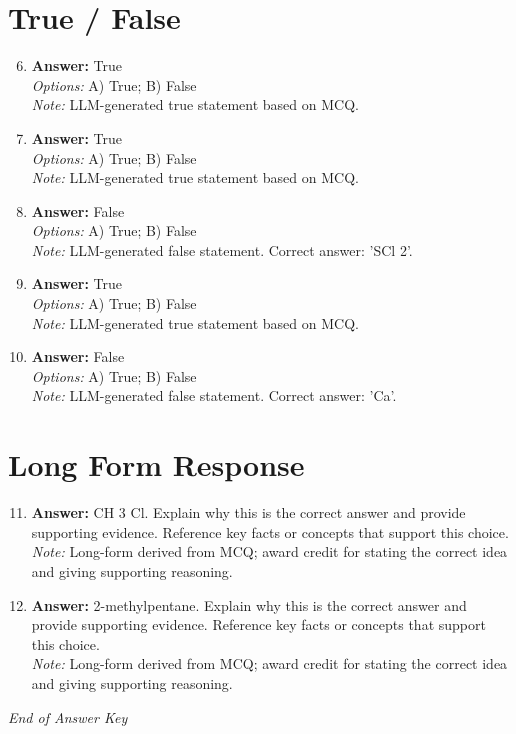 \documentclass[12pt]{article}
\begin{document}
\section*{True / False}
\begin{enumerate}[label=\arabic*.]
\setcounter{enumi}{5}
\item \textbf{Answer:} True
\\ \textit{Options:} A) True; B) False
\\ \textit{Note:} LLM-generated true statement based on MCQ.
\item \textbf{Answer:} True
\\ \textit{Options:} A) True; B) False
\\ \textit{Note:} LLM-generated true statement based on MCQ.
\item \textbf{Answer:} False
\\ \textit{Options:} A) True; B) False
\\ \textit{Note:} LLM-generated false statement. Correct answer: 'SCl 2'.
\item \textbf{Answer:} True
\\ \textit{Options:} A) True; B) False
\\ \textit{Note:} LLM-generated true statement based on MCQ.
\item \textbf{Answer:} False
\\ \textit{Options:} A) True; B) False
\\ \textit{Note:} LLM-generated false statement. Correct answer: 'Ca'.
\end{enumerate}

\section*{Long Form Response}
\begin{enumerate}[label=\arabic*.]
\setcounter{enumi}{10}
\item \textbf{Answer:} CH 3 Cl. Explain why this is the correct answer and provide supporting evidence. Reference key facts or concepts that support this choice.
\\ \textit{Note:} Long-form derived from MCQ; award credit for stating the correct idea and giving supporting reasoning.
\item \textbf{Answer:} 2-methylpentane. Explain why this is the correct answer and provide supporting evidence. Reference key facts or concepts that support this choice.
\\ \textit{Note:} Long-form derived from MCQ; award credit for stating the correct idea and giving supporting reasoning.
\end{enumerate}

\vfill
\noindent\textit{End of Answer Key}
\end{document}
